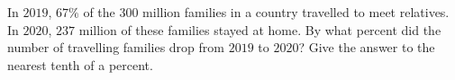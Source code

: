 In $2019$, $67\%$ of the $300$ million families in a country travelled to meet relatives. In $2020$, $237$ million of these families stayed at home. By what percent did the number of travelling families drop from $2019$ to $2020$? Give the answer to the nearest tenth of a percent.

